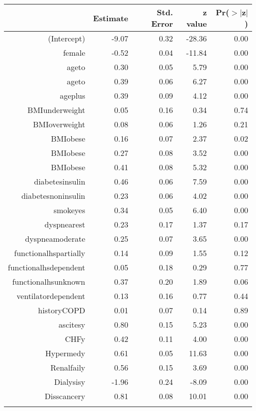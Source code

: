 \bigskip\bigskip
\centering
\begin{tabular}{rrrrr}
  \hline
 & Estimate & Std. Error & z value & Pr($>$$|$z$|$) \\ 
  \hline
(Intercept) & -9.07 & 0.32 & -28.36 & 0.00 \\ 
  female & -0.52 & 0.04 & -11.84 & 0.00 \\ 
  age\-65\-to\-74 & 0.30 & 0.05 & 5.79 & 0.00 \\ 
  age\-75\-to\-84 & 0.39 & 0.06 & 6.27 & 0.00 \\ 
  age\-85\-plus & 0.39 & 0.09 & 4.12 & 0.00 \\ 
  BMI\-underweight & 0.05 & 0.16 & 0.34 & 0.74 \\ 
  BMI\-overweight & 0.08 & 0.06 & 1.26 & 0.21 \\ 
  BMI\-obese\-1 & 0.16 & 0.07 & 2.37 & 0.02 \\ 
  BMI\-obese\-2 & 0.27 & 0.08 & 3.52 & 0.00 \\ 
  BMI\-obese\-3 & 0.41 & 0.08 & 5.32 & 0.00 \\ 
  diabetes\-insulin & 0.46 & 0.06 & 7.59 & 0.00 \\ 
  diabetes\-noninsulin & 0.23 & 0.06 & 4.02 & 0.00 \\ 
  smoke\-yes & 0.34 & 0.05 & 6.40 & 0.00 \\ 
  dyspnea\-rest & 0.23 & 0.17 & 1.37 & 0.17 \\ 
  dyspnea\-moderate & 0.25 & 0.07 & 3.65 & 0.00 \\ 
  functional\-hs\-partially & 0.14 & 0.09 & 1.55 & 0.12 \\ 
  functional\-hs\-dependent & 0.05 & 0.18 & 0.29 & 0.77 \\ 
  functional\-hs\-unknown & 0.37 & 0.20 & 1.89 & 0.06 \\ 
  ventilator\-dependent & 0.13 & 0.16 & 0.77 & 0.44 \\ 
  history\-COPD & 0.01 & 0.07 & 0.14 & 0.89 \\ 
  ascites\-y & 0.80 & 0.15 & 5.23 & 0.00 \\ 
  CHF\-y & 0.42 & 0.11 & 4.00 & 0.00 \\ 
  Hyper\-med\-y & 0.61 & 0.05 & 11.63 & 0.00 \\ 
  Renal\-fail\-y & 0.56 & 0.15 & 3.69 & 0.00 \\ 
  Dialysis\-y & -1.96 & 0.24 & -8.09 & 0.00 \\ 
  Diss\-cancer\-y & 0.81 & 0.08 & 10.01 & 0.00 \\ 
$$
\end{tabular}
